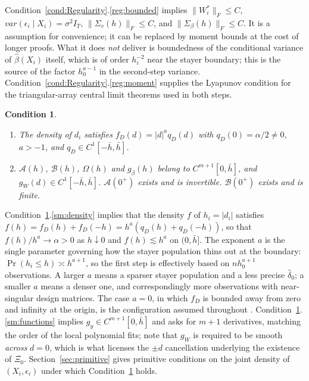 \documentclass{article}
\newtheorem{condition}{Condition}
\newcommand{\normm}[1]{\lVert#1\rVert}
\begin{document}
\noindent
Condition~\ref{cond:Regularity}.\ref{reg:bounded} implies $\normm{W_i^{*}}_F\le C$, $var(\epsilon_i\mid X_i)=\sigma^2I_T$, $\normm{\Sigma_v(h)}_F\le C$, and $\normm{\Sigma_\beta(h)}_F\leq C$. It is a assumption for convenience; it can be replaced by moment bounds at the cost of
longer proofs. What it does \emph{not} deliver is boundedness of the conditional variance of
$\hat\beta(X_i)$ itself, which is of order $h_i^{-2}$ near the stayer boundary; this is the source
of the factor $h_0^{a-1}$ in the second-step variance. Condition~\ref{cond:Regularity}.\ref{reg:moment} supplies the Lyapunov condition for the triangular-array central limit theorems used in both steps.

\begin{condition}\label{cond:Smoothness}\leavevmode
    \begin{enumerate}
        \item\label{sm:density} The density of $d_i$ satisfies $f_D(d)=|d|^{a}q_D(d)$ with
              $q_D(0)=\alpha/2\neq 0$, $a>-1$, and $q_D\in C^{1}[-\bar{h},\bar{h}]$.
        \item\label{sm:functions} $\mathcal{A}(h)$, $\mathcal{B}(h)$, $\Omega(h)$ and $g_{\beta}(h)$
              belong to $C^{m+1}[0,\bar{h}]$, and $g_W(d)\in C^{1}[-\bar{h},\bar{h}]$. $\mathcal{A}(0^{+})$ exists and is invertible. $\mathcal{B}(0^{+})$ exists and is finite.
    \end{enumerate}
\end{condition}

\noindent
Condition~\ref{cond:Smoothness}.\ref{sm:density} implies that the density $f$ of $h_i=|d_i|$
satisfies $f(h)=f_D(h)+f_D(-h)=h^{a}\left(q_D(h)+q_D(-h)\right)$, so that $f(h)/h^{a}\to\alpha>0$
as $h\downarrow0$ and $f(h)\lesssim h^{a}$ on $(0,\bar h]$. The exponent $a$ is the single parameter governing how the stayer
population thins out at the boundary: $\Pr(h_i\le h)\asymp h^{a+1}$, so the first step is
effectively based on $nh_0^{a+1}$ observations. A larger $a$ means a sparser stayer population and
a less precise $\hat\delta_0$; a smaller $a$ means a denser one, and correspondingly more
observations with near-singular design matrices. The case
$a=0$, in which $f_D$ is bounded away from zero and infinity at the origin, is the configuration
assumed throughout \cite{grahampowell}. Condition~\ref{cond:Smoothness}.\ref{sm:functions} implies $g_y\in C^{m+1}[0,\bar h]$ and asks for $m+1$ derivatives, matching the order of the local polynomial fits; note that $g_W$ is required
to be smooth \emph{across} $d=0$, which is what licenses the $\pm d$ cancellation underlying the
existence of $\Xi_0$. Section~\ref{sec:primitive} gives primitive conditions on the joint density
of $(X_i,\epsilon_i)$ under which Condition~\ref{cond:Smoothness} holds.
\end{document}
